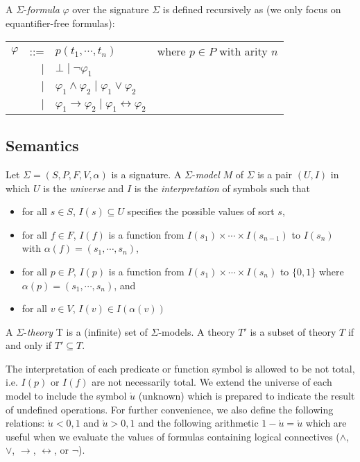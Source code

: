 A $\Sigma$-\emph{formula} $\varphi$ over the signature $\Sigma$ is defined recursively as (we only focus on equantifier-free formulas):

\begin{center}
\begin{tabular}{l r l l}
$\varphi$ &::=& $p(t_1, \cdots, t_n)$ &where $p \in P$ with arity $n$ \\ 
&$\mid$ & $\bot \mid \neg \varphi_1$ &\\
&$\mid$ & $\varphi_1 \wedge \varphi_2 \mid \varphi_1 \vee \varphi_2$ & \\
&$\mid$ & $\varphi_1 \rightarrow \varphi_2 \mid \varphi_1 \leftrightarrow \varphi_2$ & \\
\end{tabular}
\end{center}

\subsection{Semantics}

\begin{definition}
Let $\Sigma = (S, P, F, V, \alpha)$ is a signature. A $\Sigma$-\emph{model} $M$ of $\Sigma$ is a pair $(U, I)$ in which $U$ is the \emph{universe} and $I$ is the \emph{interpretation} of symbols such that
\begin{itemize}
\sloppy
\item for all $s \in S$, $I(s) \subseteq U$ specifies the possible values of sort $s$,
\item for all $f \in F$, $I(f)$ is a function from $I(s_1) \times \cdots \times I(s_{n-1})$ to $I(s_n)$ with ${\alpha(f) = (s_1,\cdots, s_n)}$,
\item for all $p \in P$, $I(p)$ is a function from $I(s_1) \times \cdots \times I(s_n)$ to $\{0, 1\}$ where ${\alpha(p) = (s_1,\cdots, s_n)}$, and
\item for all $v \in V$, $I(v) \in I(\alpha(v))$
\end{itemize}
A $\Sigma$-\emph{theory} T is a (infinite) set of $\Sigma$-models. A theory $T'$ is a subset of theory $T$ if and only if $T' \subseteq T$.
\end{definition}

The interpretation of each predicate or function symbol is allowed to be not total, i.e. $I(p)$ or $I(f)$ are not necessarily total. We extend the universe of each model to include the symbol $\mathring{u}$ (unknown) which is prepared to indicate the result of undefined operations. For further convenience, we also define the following relations: $\mathring{u} < 0, 1$ and $\mathring{u} > 0, 1$ and the following arithmetic $1 - \mathring{u} = \mathring{u}$ which are useful when we evaluate the values of formulas containing logical connectives ($\wedge$, $\vee$, $\rightarrow$, $\leftrightarrow$, or $\neg$). 

